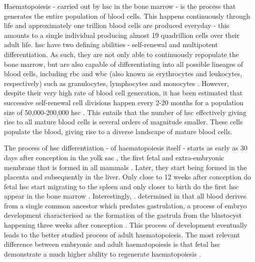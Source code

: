 Haematopoiesis - carried out by \ac{hsc} in the bone marrow - is the process that generates the entire population of blood cells. This happens continuously through life and approximately one trillion blood cells are produced everyday \cite{Hoggatt2013-jl} - this amounts to a single individual producing almost 19 quadrillion cells over their adult life. \ac{hsc} have two defining abilities - self-renewal and multipotent differentiation. As such, they are not only able to continuously repopulate the bone marrow, but are also capable of differentiating into all possible lineages of blood cells, including \ac{rbc} and \ac{wbc} (also known as erythrocytes and leukocytes, respectively) such as granulocytes, lymphocytes and monocytes \cite{Seita2010-ms,Till1961-mi,Becker1963-wm}. However, despite their very high rate of blood cell generation, it has been estimated that successive self-renewal cell divisions happen every 2-20 months for a population size of 50,000-200,000 \ac{hsc} \cite{Lee-Six2018-lp}. This entails that the number of \ac{hsc} effectively giving rise to all mature blood cells is several orders of magnitude smaller. These cells populate the blood, giving rise to a diverse landscape of mature blood cells.

The process of \ac{hsc} differentiation - of haematopoiesis itself - starts as early as 30 days after conception in the yolk sac \cite{Rieger2012-bh}, the first fetal and extra-embryonic membrane that is formed in all mammals \cite{Dong2018-se}. Later, they start being formed in the placenta and subsequently in the liver. Only close to 12 weeks after conception do fetal \ac{hsc} start migrating to the spleen and only closer to birth do the first \ac{hsc} appear in the bone marrow \cite{Rieger2012-bh}. Interestingly, . determined in \cite{Lee-Six2018-lp} that all blood derives from a single common ancestor which predates gastrulation, a process of embryo development characterised as the formation of the gastrula from the blastocyst happening three weeks after conception \cite{Muhr2020-ep}. This process of development eventually leads to the better studied process of adult haematopoiesis. The most relevant difference between embryonic and adult haematopoiesis is that fetal \ac{hsc} demonstrate a much higher ability to regenerate haematopoiesis \cite{Becker1965-xg,Holyoake1999-nz,Nicolini1999-xe}.

